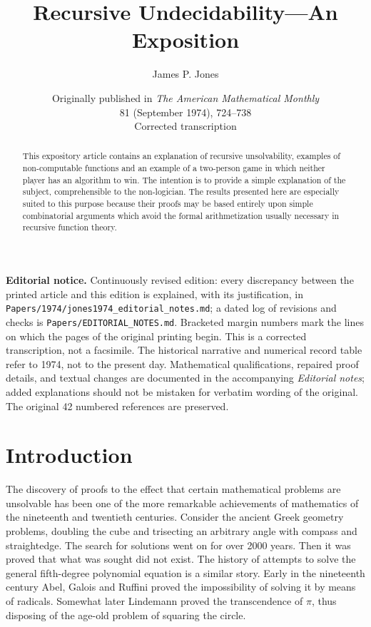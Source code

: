 \documentclass[11pt]{article}
\title{Recursive Undecidability---An Exposition}
\author{James P. Jones}
\date{\small Originally published in \emph{The American Mathematical Monthly}\\
81 (September 1974), 724--738\\[3pt]
Corrected transcription}
\newcommand{\origpage}[1]{\marginnote{\footnotesize\textbf{[#1]}}}
\begin{document}
\maketitle
\begin{center}\begin{minipage}{0.94\linewidth}\small
\textbf{Editorial notice.} Continuously revised edition: every discrepancy between the printed article and this edition is explained, with its justification, in \texttt{Papers/1974/}\allowbreak\texttt{jones1974\_editorial\_notes.md}; a dated log of revisions and checks is \texttt{Papers/EDITORIAL\_NOTES.md}. Bracketed margin numbers mark the lines on which the pages of the original printing begin. This is a corrected transcription, not a facsimile.
The historical narrative and numerical record table refer to 1974, not to the
present day. Mathematical qualifications, repaired proof details, and textual
changes are documented in the accompanying \emph{Editorial notes}; added
explanations should not be mistaken for verbatim wording of the original.
The original 42 numbered references are preserved.
\end{minipage}\end{center}
\begin{abstract}
This expository article contains an explanation of recursive unsolvability, examples of non-computable functions and an example of a two-person game in which neither player has an algorithm to win. The intention is to provide a simple explanation of the subject, comprehensible to the non-logician. The results presented here are especially suited to this purpose because their proofs may be based entirely upon simple combinatorial arguments which avoid the formal arithmetization usually necessary in recursive function theory.
\end{abstract}

\section{Introduction}
\origpage{724}The discovery of proofs to the effect that certain mathematical problems are unsolvable has been one of the more remarkable achievements of mathematics of the nineteenth and twentieth centuries. Consider the ancient Greek geometry problems, doubling the cube and trisecting an arbitrary angle with compass and straightedge. The search for solutions went on for over 2000 years. Then it was proved that what was sought did not exist. The history of attempts to solve the general fifth-degree polynomial equation is a similar story. Early in the nineteenth century Abel, Galois and Ruffini proved the impossibility of solving it by means of radicals. Somewhat later Lindemann proved the transcendence of $\pi$, thus disposing of the age-old problem of squaring the circle.
\end{document}
